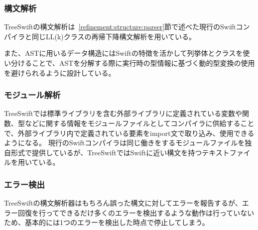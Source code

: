 \subsubsection{構文解析}

TreeSwiftの構文解析は~\ref{refinement:structure:parser}節で述べた現行のSwiftコンパイラと同じLL(k)クラスの再帰下降構文解析を用いている。

また、ASTに用いるデータ構造にはSwiftの特徴を活かして列挙体とクラスを使い分けることで、ASTを分解する際に実行時の型情報に基づく動的型変換の使用を避けられるように設計している。

\subsubsection{モジュール解析}

TreeSwiftでは標準ライブラリを含む外部ライブラリに定義されている変数や関数、型などに関する情報をモジュールファイルとしてコンパイラに供給することで、外部ライブラリ内で定義されている要素をimport文で取り込み、使用できるようになる。
現行のSwiftコンパイラは同じ働きをするモジュールファイルを独自形式で提供しているが、TreeSwiftではSwiftに近い構文を持つテキストファイルを用いている。

\subsubsection{エラー検出}

TreeSwiftの構文解析器はもちろん誤った構文に対してエラーを報告するが、エラー回復を行ってできるだけ多くのエラーを検出するような動作は行っていないため、基本的には1つのエラーを検出した時点で停止してしまう。

